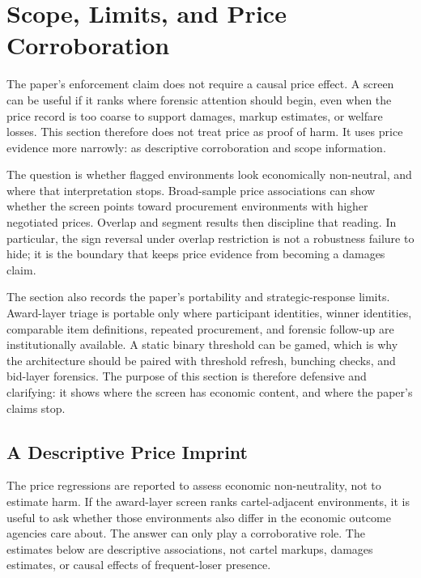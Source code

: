 \section{Scope, Limits, and Price Corroboration}
\label{sec:price_scope_conclusion}

The paper's enforcement claim does not require a causal price
effect. A screen can be useful if it ranks where forensic
attention should begin, even when the price record is too
coarse to support damages, markup estimates, or welfare losses.
This section therefore does not treat price as proof of harm.
It uses price evidence more narrowly: as descriptive
corroboration and scope information.

The question is whether flagged environments look economically
non-neutral, and where that interpretation stops. Broad-sample
price associations can show whether the screen points toward
procurement environments with higher negotiated prices. Overlap
and segment results then discipline that reading. In
particular, the sign reversal under overlap restriction is not
a robustness failure to hide; it is the boundary that keeps
price evidence from becoming a damages claim.

The section also records the paper's portability and
strategic-response limits. Award-layer triage is portable only
where participant identities, winner identities, comparable
item definitions, repeated procurement, and forensic follow-up
are institutionally available. A static binary threshold can be
gamed, which is why the architecture should be paired with
threshold refresh, bunching checks, and bid-layer forensics.
The purpose of this section is therefore defensive and
clarifying: it shows where the screen has economic content, and
where the paper's claims stop.

\subsection{A Descriptive Price Imprint}
\label{sec:price_imprint_v18}

The price regressions are reported to assess economic
non-neutrality, not to estimate harm. If the award-layer screen
ranks cartel-adjacent environments, it is useful to ask whether
those environments also differ in the economic outcome agencies
care about. The answer can only play a corroborative role. The
estimates below are descriptive associations, not cartel
markups, damages estimates, or causal effects of frequent-loser
presence.

